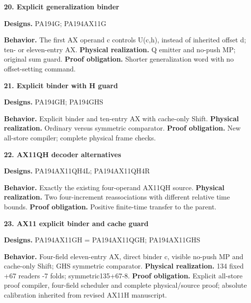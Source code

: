 \documentclass[10pt,a4paper]{article}
\begin{document}
\par\medskip\begin{samepage}\noindent\textbf{20. Explicit generalization binder}\par\nobreak
\textbf{Designs.} PA194\allowbreak{}G;\allowbreak{} PA194\allowbreak{}AX11\allowbreak{}G

\textbf{Behavior.} The first AX operand c controls U(c,\allowbreak{}h), instead of inherited offset d; ten- or eleven-entry AX. \textbf{Physical realization.} Q emitter and no-push MP; original sum guard. \textbf{Proof obligation.} Shorter generalization word with no offset-setting command.
\end{samepage}

\par\medskip\begin{samepage}\noindent\textbf{21. Explicit binder with H guard}\par\nobreak
\textbf{Designs.} PA194\allowbreak{}GH;\allowbreak{} PA194\allowbreak{}GHS

\textbf{Behavior.} Explicit binder and ten-entry AX with cache-only Shift. \textbf{Physical realization.} Ordinary versus symmetric comparator. \textbf{Proof obligation.} New all-store compiler; complete physical frame checks.
\end{samepage}

\par\medskip\begin{samepage}\noindent\textbf{22. AX11QH decoder alternatives}\par\nobreak
\textbf{Designs.} PA194\allowbreak{}AX11\allowbreak{}QH4L;\allowbreak{} PA194\allowbreak{}AX11\allowbreak{}QH4R

\textbf{Behavior.} Exactly the existing four-operand AX11QH source. \textbf{Physical realization.} Two four-increment reassociations with different relative time bounds. \textbf{Proof obligation.} Positive finite-time transfer to the parent.
\end{samepage}

\par\medskip\begin{samepage}\noindent\textbf{23. AX11 explicit binder and cache guard}\par\nobreak
\textbf{Designs.} PA194\allowbreak{}AX11\allowbreak{}GH = PA194\allowbreak{}AX11\allowbreak{}QGH;\allowbreak{} PA194\allowbreak{}AX11\allowbreak{}GHS

\textbf{Behavior.} Four-field eleven-entry AX, direct binder c, visible no-push MP and cache-only Shift; GHS symmetric comparator. \textbf{Physical realization.} 134 fixed +67 readers -7 folds; symmetric135+67-8. \textbf{Proof obligation.} Explicit all-store proof compiler, four-field scheduler and complete physical/source proof; absolute calibration inherited from revised AX11H manuscript.
\end{samepage}
\end{document}
